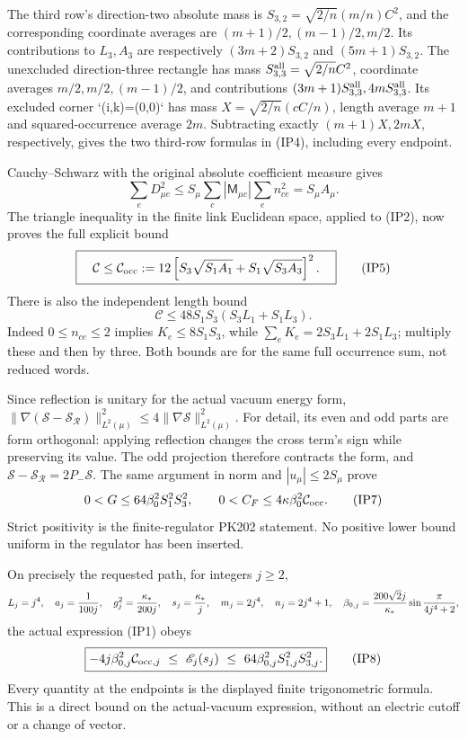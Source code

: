 \documentclass[11pt]{article}
\begin{document}
The third row's direction-two absolute mass is
\(S_{3,2}=\sqrt{2/n}(m/n)C^2\), and the corresponding coordinate
averages are \((m+1)/2,(m-1)/2,m/2\). Its contributions to
\(L_3,A_3\) are respectively \((3m+2)S_{3,2}\) and
\((5m+1)S_{3,2}\).
The unexcluded direction-three rectangle has mass
\(S_{3,3}^{\rm all}=\sqrt{2/n}C^2\), coordinate averages
\(m/2,m/2,(m-1)/2\), and contributions
\((3m+1)S_{3,3}^{\rm all},4mS_{3,3}^{\rm all}\).
Its excluded corner `(i,k)=(0,0)` has mass
\(X=\sqrt{2/n}(cC/n)\), length average \(m+1\) and squared-occurrence
average \(2m\). Subtracting exactly \((m+1)X,2mX\), respectively,
gives the two third-row formulas in (IP4), including every endpoint.

Cauchy–Schwarz with the original absolute coefficient measure gives
\[
 \sum_eD_{\mu e}^2
 \le S_\mu\sum_c|\mathsf M_{\mu c}|\sum_en_{ce}^2=S_\mu A_\mu.
\]
The triangle inequality in the finite link Euclidean space, applied
to (IP2), now proves the full explicit bound
\[
\boxed{\quad
\mathcal C\le\mathcal C_{\rm occ}:=
12\left[S_3\sqrt{S_1A_1}+S_1\sqrt{S_3A_3}\right]^2.
\quad}\tag{IP5}
\]
There is also the independent length bound
\[
 \mathcal C\le48S_1S_3(S_3L_1+S_1L_3).\tag{IP6}
\]
Indeed \(0\le n_{ce}\le2\) implies
\(K_e\le8S_1S_3\), while
\(\sum_eK_e=2S_3L_1+2S_1L_3\); multiply these and then by three.
Both bounds are for the same full occurrence sum, not reduced words.

Since reflection is unitary for the actual vacuum energy form,
\(\|\nabla(\mathcal S-\mathcal S_{\mathcal R})\|_{L^2(\mu)}^2
\le4\|\nabla\mathcal S\|_{L^2(\mu)}^2\).
For detail, its even and odd parts are form orthogonal: applying
reflection changes the cross term's sign while preserving its value.
The odd projection therefore contracts the form, and
\(\mathcal S-\mathcal S_{\mathcal R}=2P_-\mathcal S\).
The same argument in norm and \(|u_\mu|\le2S_\mu\) prove
\[
0<G\le64\beta_0^2S_1^2S_3^2,\qquad
0<C_F\le4\kappa\beta_0^2\mathcal C_{\rm occ}.\tag{IP7}
\]
Strict positivity is the finite-regulator PK202 statement. No positive
lower bound uniform in the regulator has been inserted.

On precisely the requested path, for integers \(j\ge2\),
\[
 L_j=j^4,\quad a_j={1\over100j},\quad
 g_j^2={\kappa_*\over200j},\quad s_j={\kappa_*\over j},\quad
 m_j=2j^4,\quad n_j=2j^4+1,\quad
 \beta_{0,j}={200\sqrt2j\over\kappa_*}\sin{\pi\over4j^4+2},
\]
the actual expression (IP1) obeys
\[
\boxed{
 -4j\beta_{0,j}^2\mathcal C_{{\rm occ},j}
 \ \le\ \mathscr E_j(s_j)
 \ \le\ 64\beta_{0,j}^2S_{1,j}^2S_{3,j}^2.
}\tag{IP8}
\]
Every quantity at the endpoints is the displayed finite trigonometric
formula. This is a direct bound on the actual-vacuum expression, without
an electric cutoff or a change of vector.
\end{document}
